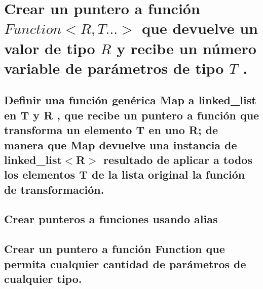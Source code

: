 \documentclass[10pt]{article}
\begin{document}
\vspace{2em}
\section{Crear un puntero a función $ Function<R, T...> $ que devuelve un valor de tipo $ R $ y recibe un número variable de parámetros de tipo $ T $ .}

\subsection{Definir una función genérica Map a linked\_list en T y R , que recibe un puntero a función que transforma un elemento T en uno R; de manera que Map devuelve una instancia de linked\_list$ < $R$ > $ resultado de aplicar a todos los elementos T de la lista original la función de transformación.}

\subsection{Crear punteros a funciones usando alias }

\subsection{Crear un puntero a función Function que permita cualquier cantidad de parámetros de cualquier tipo.}
\end{document}
